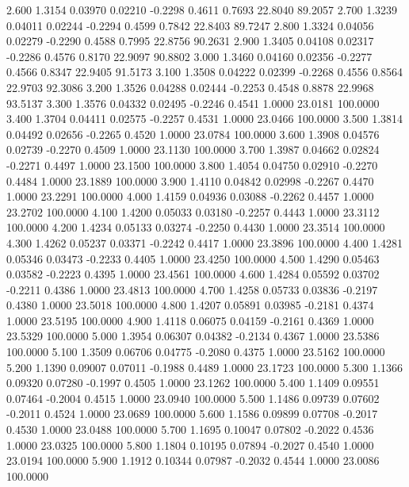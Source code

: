    2.600   1.3154   0.03970   0.02210  -0.2298   0.4611   0.7693  22.8040  89.2057
   2.700   1.3239   0.04011   0.02244  -0.2294   0.4599   0.7842  22.8403  89.7247
   2.800   1.3324   0.04056   0.02279  -0.2290   0.4588   0.7995  22.8756  90.2631
   2.900   1.3405   0.04108   0.02317  -0.2286   0.4576   0.8170  22.9097  90.8802
   3.000   1.3460   0.04160   0.02356  -0.2277   0.4566   0.8347  22.9405  91.5173
   3.100   1.3508   0.04222   0.02399  -0.2268   0.4556   0.8564  22.9703  92.3086
   3.200   1.3526   0.04288   0.02444  -0.2253   0.4548   0.8878  22.9968  93.5137
   3.300   1.3576   0.04332   0.02495  -0.2246   0.4541   1.0000  23.0181 100.0000
   3.400   1.3704   0.04411   0.02575  -0.2257   0.4531   1.0000  23.0466 100.0000
   3.500   1.3814   0.04492   0.02656  -0.2265   0.4520   1.0000  23.0784 100.0000
   3.600   1.3908   0.04576   0.02739  -0.2270   0.4509   1.0000  23.1130 100.0000
   3.700   1.3987   0.04662   0.02824  -0.2271   0.4497   1.0000  23.1500 100.0000
   3.800   1.4054   0.04750   0.02910  -0.2270   0.4484   1.0000  23.1889 100.0000
   3.900   1.4110   0.04842   0.02998  -0.2267   0.4470   1.0000  23.2291 100.0000
   4.000   1.4159   0.04936   0.03088  -0.2262   0.4457   1.0000  23.2702 100.0000
   4.100   1.4200   0.05033   0.03180  -0.2257   0.4443   1.0000  23.3112 100.0000
   4.200   1.4234   0.05133   0.03274  -0.2250   0.4430   1.0000  23.3514 100.0000
   4.300   1.4262   0.05237   0.03371  -0.2242   0.4417   1.0000  23.3896 100.0000
   4.400   1.4281   0.05346   0.03473  -0.2233   0.4405   1.0000  23.4250 100.0000
   4.500   1.4290   0.05463   0.03582  -0.2223   0.4395   1.0000  23.4561 100.0000
   4.600   1.4284   0.05592   0.03702  -0.2211   0.4386   1.0000  23.4813 100.0000
   4.700   1.4258   0.05733   0.03836  -0.2197   0.4380   1.0000  23.5018 100.0000
   4.800   1.4207   0.05891   0.03985  -0.2181   0.4374   1.0000  23.5195 100.0000
   4.900   1.4118   0.06075   0.04159  -0.2161   0.4369   1.0000  23.5329 100.0000
   5.000   1.3954   0.06307   0.04382  -0.2134   0.4367   1.0000  23.5386 100.0000
   5.100   1.3509   0.06706   0.04775  -0.2080   0.4375   1.0000  23.5162 100.0000
   5.200   1.1390   0.09007   0.07011  -0.1988   0.4489   1.0000  23.1723 100.0000
   5.300   1.1366   0.09320   0.07280  -0.1997   0.4505   1.0000  23.1262 100.0000
   5.400   1.1409   0.09551   0.07464  -0.2004   0.4515   1.0000  23.0940 100.0000
   5.500   1.1486   0.09739   0.07602  -0.2011   0.4524   1.0000  23.0689 100.0000
   5.600   1.1586   0.09899   0.07708  -0.2017   0.4530   1.0000  23.0488 100.0000
   5.700   1.1695   0.10047   0.07802  -0.2022   0.4536   1.0000  23.0325 100.0000
   5.800   1.1804   0.10195   0.07894  -0.2027   0.4540   1.0000  23.0194 100.0000
   5.900   1.1912   0.10344   0.07987  -0.2032   0.4544   1.0000  23.0086 100.0000
